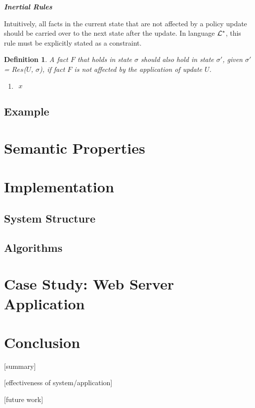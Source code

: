 \documentclass[10pt, twocolumn]{article}
\newtheorem{definition}{Definition}
\begin{document}
        \noindent \textbf{\emph{Inertial Rules}}

          Intuitively, all facts in the current state that are not affected by
          a policy update should be carried over to the next state after the
          update. In language ${\cal L}^{*}$, this rule must be explicitly
          stated as a constraint.

          \begin{definition}
            A fact $F$ that holds in state $\sigma$ should also hold in state
            $\sigma'$, given $\sigma'$ = $Res$($U$, $\sigma$), if fact $F$ is
            not affected by the application of update $U$.

            \begin{enumerate}
              \item
                \begin{math} 
                  \begin{aligned}
                    x 
                  \end{aligned}
                \end{math}
            \end{enumerate}
          \end{definition}

    \subsection{Example}

  \section{Semantic Properties}

  \section{Implementation}

    \subsection{System Structure}

    \subsection{Algorithms}

  \section{Case Study: Web Server Application}

  \section{Conclusion}

    [summary]

    [effectiveness of system/application]

    [future work]
\end{document}
